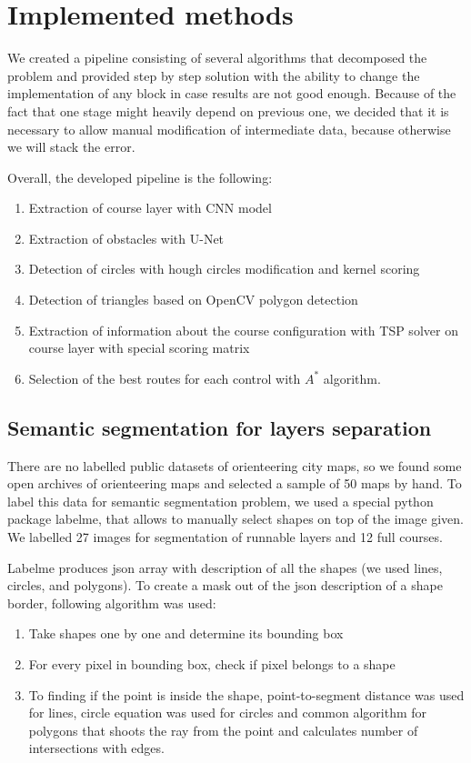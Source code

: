 \documentclass[a4paper,12pt]{extarticle}
\begin{document}
\section{Implemented methods}

We created a pipeline consisting of several algorithms that decomposed the problem and provided step by step solution with the ability to change the implementation of any block in case results are not good enough.
Because of the fact that one stage might heavily depend on previous one, we decided that it is necessary to allow manual modification of intermediate data, because otherwise we will stack the error.

Overall, the developed pipeline is the following:
\begin{enumerate}
\item Extraction of course layer with CNN model
\item Extraction of obstacles with U-Net
\item Detection of circles with hough circles modification and kernel scoring
\item Detection of triangles based on OpenCV polygon detection
\item Extraction of information about the course configuration with TSP solver on course layer with special scoring matrix
\item Selection of the best routes for each control with $A^*$ algorithm.
\end{enumerate}


\subsection{Semantic segmentation for layers separation}

There are no labelled public datasets of orienteering city maps, so we found some open archives of orienteering maps and selected a sample of 50 maps by hand.
To label this data for semantic segmentation problem, we used a special python package labelme, that allows to manually select shapes on top of the image given.
We labelled 27 images for segmentation of runnable layers and 12 full courses.

Labelme produces json array with description of all the shapes (we used lines, circles, and polygons).
To create a mask out of the json description of a shape border, following algorithm was used:
\begin{enumerate}
    \item Take shapes one by one and determine its bounding box
    \item For every pixel in bounding box, check if pixel belongs to a shape
    \item To finding if the point is inside the shape, point-to-segment distance was used for lines, circle equation was used for circles and common algorithm for polygons that shoots the ray from the point and calculates number of intersections with edges.
\end{enumerate}
\end{document}
